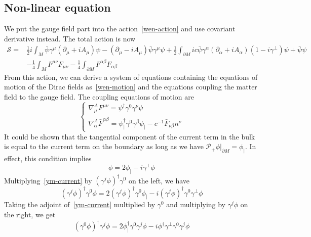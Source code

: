 \subsection{Non-linear equation}
We put the gauge field part into the action~\cref{wen-action} and use covariant derivative instead. 
The total action is now
\begin{equation*}
\begin{split}
\mathcal{S} = & \frac{1}{2}i\int_M \bar{\psi} \gamma^\mu (\partial_\mu+i A_\mu) \psi - (\partial_\mu - iA_\mu) \bar{\psi} \gamma^\mu \psi 
+ \frac{1}{2}\int_{\partial M} ic \bar{\psi} \gamma^\alpha (\partial_\alpha+iA_\alpha) (1 - i \gamma^\bot) \psi
+ \bar{\psi} \psi \\ 
%
& - \frac 1 4 \int_M F^{\mu\nu}F_{\mu\nu} - \frac 1 4 \int_{\partial M} F^{\alpha\beta}F_{\alpha\beta}
\end{split}
\end{equation*}
From this action, we can derive a system of equations containing the equations of motion of the Dirac fields as~\cref{wen-motion} and the equations coupling the matter field to the gauge field.
The coupling equations of motion are
\begin{equation}\label{ym-coupling}
\begin{cases}
\nabla^A_\mu F^{\mu\nu} = \psi^\dagger\gamma^0\gamma^\nu\psi \\
%
\nabla^{\bar{A}}_\alpha \bar{F}^{\alpha\beta} = \psi_|^\dagger\gamma^0\gamma^\beta\psi_| -c^{-1}\bar{F}_{\nu\beta}n^\nu 
\end{cases}
\end{equation}
It could be shown that the tangential component of the current term in the bulk is equal to the current term on the boundary as long as we have $\mathcal{P}_+\phi\vert_{\partial M} = \phi_|$. 
In effect, this condition implies
\begin{equation}\label{ym-current}
\phi = 2 \phi_| - i\gamma^\bot\phi
\end{equation}
Multiplying~\cref{ym-current} by $(\gamma^j\phi)^\dagger\gamma^0$ on the left, we have
\begin{equation}\label{ym-current1}
(\gamma^j\phi)^\dagger\gamma^0\phi = 2(\gamma^j\phi)^\dagger\gamma^0\phi_| - i(\gamma^j\phi)^\dagger\gamma^0\gamma^\bot\phi
\end{equation}
Taking the adjoint of~\cref{ym-current} multiplied by $\gamma^0$ and multiplying by $\gamma^j\phi$ on the right, we get
\begin{equation}\label{ym-current2}
(\gamma^0\phi)^\dagger\gamma^j\phi = 2\phi^\dagger_|\gamma^0\gamma^j\phi - i\phi^\dagger\gamma^\bot\gamma^0\gamma^j\phi
\end{equation}
